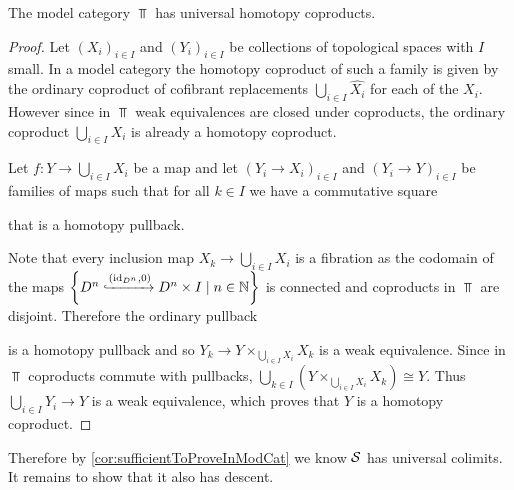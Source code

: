 \begin{lemma}\label{lem:topUniversalCoproduct}
    The model category $\Top$ has universal homotopy coproducts.
    \begin{proof}
        	Let $\left(X_i\right)_{i\in I}$ and $\left(Y_i\right)_{i\in I}$ be collections of topological spaces with $I$ small. 
            In a model category the homotopy coproduct of such a family is given by the ordinary coproduct of cofibrant replacements $\bigcup\limits_{i\in I}\widehat{X_i}$ for each of the $X_i$.
            However since in $\Top$ weak equivalences are closed under coproducts, the ordinary coproduct $\bigcup\limits_{i\in I}X_i$ is already a homotopy coproduct.

            Let $f\colon Y\to\bigcup\limits_{i\in I}X_i$ be a map and let $\left(Y_i\to X_i\right)_{i\in I}$ and $\left(Y_i\to Y\right)_{i\in I}$ be families of maps such that for all $k\in I$ we have a commutative square
            \begin{center}
            \end{center}
            that is a homotopy pullback.

            Note that every inclusion map $X_k\to\bigcup\limits_{i\in I} X_i$ is a fibration as the codomain of the maps $\left\lbrace D^n\xhookrightarrow{\left(\text{id}_{D^n},0\right)}D^n\times I\mid n\in\mathbb{N}\right\rbrace$ is connected and coproducts in $\Top$ are disjoint.
            Therefore the ordinary pullback
            \begin{center}
            \end{center}
            is a homotopy pullback and so $Y_k\to Y\times_{\bigcup\limits_{i\in I} X_i}X_k$ is a weak equivalence.
            Since in $\Top$ coproducts commute with pullbacks, $\bigcup\limits_{k\in I}\left(Y\times_{\bigcup\limits_{i\in I} X_i}X_k\right)\cong Y$.
            Thus $\bigcup\limits_{i\in I}Y_i\to Y$ is a weak equivalence, which proves that $Y$ is a homotopy coproduct.
    \end{proof}
\end{lemma}
Therefore by \cref{cor:sufficientToProveInModCat} we know $\mathcal{S}$ has universal colimits.
It remains to show that it also has descent.

